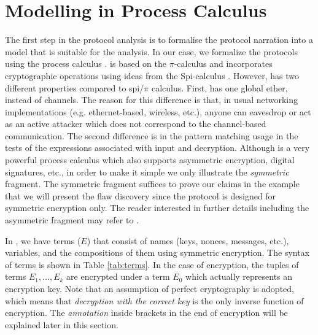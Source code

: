 \section{Modelling in \LYSA Process Calculus}
\label{lys}
The first step in the protocol analysis is to formalise the protocol
narration into a model that is suitable for the analysis.
In our case, we formalize the protocols using the \LYSA process calculus \cite{bod:1}. 
\LYSA is based on the $\pi$-calculus \cite{mil} and incorporates cryptographic operations using ideas from the Spi-calculus \cite{aba:gor}. 
However, \LYSA has two different properties compared to spi/$\pi$ calculus. 
First, \LYSA has one global ether, instead of channels. 
The reason for this difference is that, in usual networking implementations (e.g. ethernet-based, wireless, etc.), 
anyone can eavesdrop or act as an active attacker which does not correspond to the channel-based communication. 
The second difference is in the pattern matching usage in the tests of the expressions associated with input and decryption.
Although \LYSA is a very powerful process calculus which also supports
asymmetric encryption, digital signatures, etc., in order to make it
simple we only illustrate the \emph{symmetric} fragment. 
The symmetric fragment suffices to prove our claims in the example
that we will present the flaw discovery since the protocol is designed
for symmetric encryption only.
The reader interested in further details including the asymmetric fragment may refer to \cite{bod:1}.
 
In \LYSA, we have terms ($E$) that consist of names (keys, nonces, messages, etc.), variables, and the compositions of them using symmetric encryption. 
The syntax of terms is shown in Table \ref{tab:terms}. 
In the case of encryption, the tuples of terms $E_1,\ldots,E_k$ are encrypted under a term $E_0$ which actually represents an encryption key. 
Note that an assumption of perfect cryptography is adopted, which means that \emph{decryption with the correct key} is the only inverse function of encryption. 
The \emph{annotation} inside brackets in the end of encryption will be explained later in this section.
 
